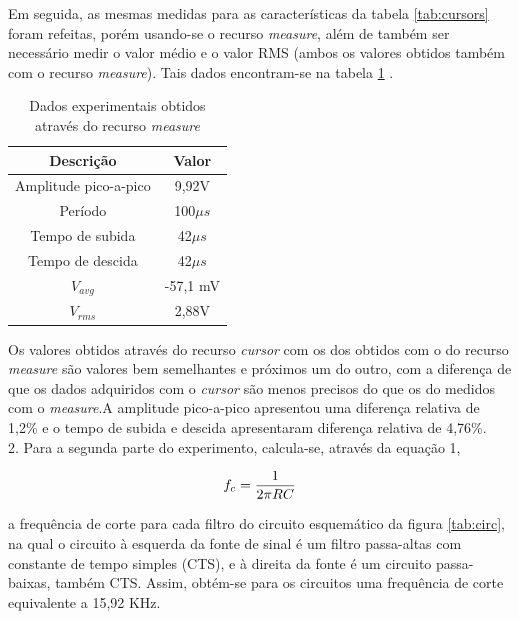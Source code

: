 \documentclass[a4paper]{article} %
\begin{document}
Em seguida, as mesmas medidas para as características da tabela \ref{tab:cursors} foram refeitas, porém usando-se o recurso \textit{measure}, além de também ser necessário medir o valor médio e o valor RMS (ambos os valores obtidos também com o recurso \textit{measure}). Tais dados encontram-se na tabela \ref{tab:measure} . 
\begin{table}[h]
\begin{centering}
\caption{Dados experimentais obtidos através do recurso \textit{measure} \label{tab:measure}}
\begin{tabular}{cc}
\hline 
Descrição & Valor\tabularnewline
\hline
Amplitude pico-a-pico & 9,92V \tabularnewline
Período & 100$\mu s$\tabularnewline
Tempo de subida & 42$\mu s$\tabularnewline
Tempo de descida  & 42$\mu s$\tabularnewline
$V_{avg}$ & -57,1 mV\tabularnewline
$V_{rms}$ & 2,88V \tabularnewline
\hline
\end{tabular}
\par\end{centering}
\end{table}
Os valores obtidos através do recurso \textit{cursor} com os dos obtidos com o do recurso \textit{measure} são valores bem semelhantes e próximos um do outro, com a diferença de que os dados adquiridos com o \textit{cursor}  são menos precisos do que os do medidos com o \textit{measure}.A amplitude pico-a-pico apresentou uma diferença relativa de 1,2\% e o tempo de subida e descida apresentaram diferença relativa de 4,76\%. \\


2. Para a segunda parte do experimento, calcula-se, através da equação 1,
\vspace{1mm}

\begin{equation}
 f_{c}=\frac{1}{2\pi RC}\\
\end{equation}

\vspace{2mm}


 a frequência de corte para cada filtro do circuito esquemático da figura \ref{tab:circ}, na qual o circuito à esquerda da fonte de sinal é um filtro passa-altas com constante de tempo simples (CTS), e à direita da fonte é um circuito passa-baixas, também CTS. Assim, obtém-se para os circuitos uma frequência de corte equivalente a 15,92 KHz.
\end{document}
